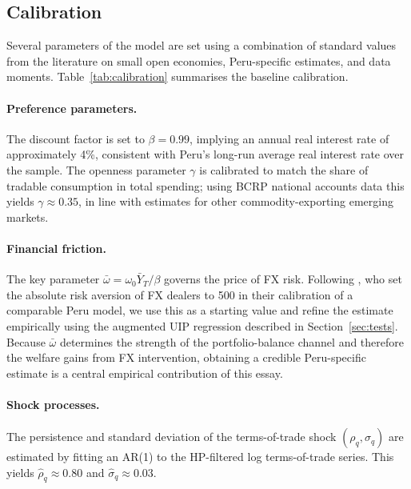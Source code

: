 \documentclass[12pt,a4paper]{article}
\begin{document}
\subsection{Calibration}

Several parameters of the model are set using a combination of standard values from the literature on small open economies, Peru-specific estimates, and data moments. Table~\ref{tab:calibration} summarises the baseline calibration.

\paragraph{Preference parameters.} The discount factor is set to $\beta = 0.99$, implying an annual real interest rate of approximately 4\%, consistent with Peru's long-run average real interest rate over the sample. The openness parameter $\gamma$ is calibrated to match the share of tradable consumption in total spending; using BCRP national accounts data this yields $\gamma \approx 0.35$, in line with estimates for other commodity-exporting emerging markets.

\paragraph{Financial friction.} The key parameter $\bar{\omega} = \omega_0 \bar{Y}_T / \beta$ governs the price of FX risk. Following \cite{MONTORO2023102825}, who set the absolute risk aversion of FX dealers to 500 in their calibration of a comparable Peru model, we use this as a starting value and refine the estimate empirically using the augmented UIP regression described in Section~\ref{sec:tests}. Because $\bar{\omega}$ determines the strength of the portfolio-balance channel and therefore the welfare gains from FX intervention, obtaining a credible Peru-specific estimate is a central empirical contribution of this essay.

\paragraph{Shock processes.} The persistence and standard deviation of the terms-of-trade shock $(\rho_q, \sigma_q)$ are estimated by fitting an AR(1) to the HP-filtered log terms-of-trade series. This yields $\hat{\rho}_q \approx 0.80$ and $\hat{\sigma}_q \approx 0.03$. %
\end{document}

